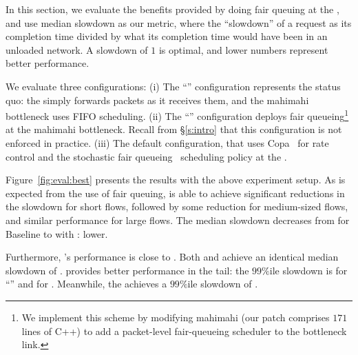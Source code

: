 
In this section, we evaluate the benefits provided by doing fair queuing at the \name, and use median slowdown as our metric, where the ``slowdown'' of a request as its completion time divided by what its completion time would have been in an unloaded network. A slowdown of $1$ is optimal, and lower numbers represent better performance.

We evaluate three configurations: 
(i) The ``\baseline'' configuration represents the status quo: the \inbox simply forwards packets as it receives them, and the mahimahi bottleneck uses FIFO scheduling.
(ii) The ``\optimal'' configuration deploys fair queueing\footnote{
We implement this scheme by modifying mahimahi (our patch comprises $171$ lines of C++) to add a packet-level fair-queueing scheduler to the bottleneck link.}
at the mahimahi bottleneck. 
Recall from \S\ref{s:intro} that this configuration is not enforced in practice.
(iii) The default \name configuration, that uses Copa~\cite{copa} for rate control and the stochastic fair queueing~\cite{sfq} scheduling policy at the \inbox.



Figure~\ref{fig:eval:best} presents the results with the above experiment setup. 
As is expected from the use of fair queuing, \name is able to achieve significant reductions in the slowdown for short flows, followed by some reduction for medium-sized flows, and similar performance for large flows. 
The median slowdown
decreases from \overviewBenefitsBaselineMedian 
for Baseline to \overviewBenefitsBundlerMedian 
with \name: \overviewBenefitsBundlerMedianImprovement
lower.

Furthermore, \name's performance is close to \optimal.
Both \name and \optimal achieve an identical median slowdown of \overviewBenefitsBundlerMedian.
\optimal provides better performance in the tail: the $99\%$ile slowdown is \overviewBenefitsOptimalTail for ``\optimal'' and \overviewBenefitsBundlerTail for \name.
Meanwhile, the \baseline achieves a $99\%$ile slowdown of \overviewBenefitsBaselineTail.

